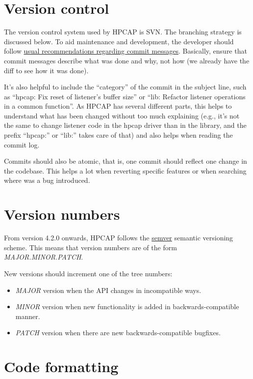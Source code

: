 \documentclass[oneside]{hpman}
\begin{document}
\section{Version control}

The version control system used by HPCAP is SVN. The branching strategy is discussed below. To aid maintenance and development, the developer should follow \href{http://chris.beams.io/posts/git-commit/}{usual recommendations regarding commit messages}. Basically, ensure that commit messages describe what was done and why, not how (we already have the diff to see how it was done).

It's also helpful to include the ``category'' of the commit in the subject line, such as ``hpcap: Fix reset of listener's buffer size'' or ``lib: Refactor listener operations in a common function''. As HPCAP has several different parts, this helps to understand what has been changed without too much explaining (e.g., it's not the same to change listener code in the hpcap driver than in the library, and the prefix ``hpcap:'' or ``lib:'' takes care of that) and also helps when reading the commit log.

Commits should also be atomic, that is, one commit should reflect one change in the codebase. This helps a lot when reverting specific features or when searching where was a bug introduced.

\section{Version numbers}
\label{sec:versioning}

From version 4.2.0 onwards, HPCAP follows the \href{http://semver.org/}{semver} semantic versioning scheme. This means that version numbers are of the form \textit{MAJOR.MINOR.PATCH}.

New versions should increment one of the tree numbers:

\begin{itemize}
\item \textit{MAJOR} version when the API changes in incompatible ways.
\item \textit{MINOR} version when new functionality is added in backwards-compatible manner.
\item \textit{PATCH} version when there are new backwards-compatible bugfixes.
\end{itemize}

\section{Code formatting}
\end{document}
